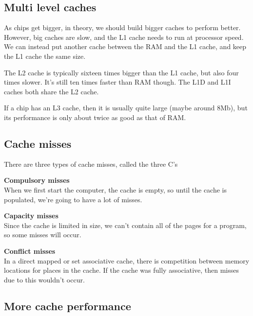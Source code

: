 \subsection{Multi level caches}

As chips get bigger, in theory, we should build bigger caches to perform better.
However, big caches are slow, and the L1 cache needs to run at processor speed.
We can instead put another cache between the RAM and the L1 cache, and keep the
L1 cache the same size.

The L2 cache is typically sixteen times bigger than the L1 cache, but also four
times slower. It's still ten times faster than RAM though. The L1D and L1I
caches both share the L2 cache.

If a chip has an L3 cache, then it is usually quite large (maybe around 8Mb),
but its performance is only about twice as good as that of RAM.


\subsection{Cache misses}

There are three types of cache misses, called the three C's

\begin{description}
  \item \textbf{Compulsory misses}\\ 
    When we first start the computer, the cache is empty, so until the cache is
    populated, we're going to have a lot of misses.
  \item \textbf{Capacity misses}\\
   Since the cache is limited in size, we can't contain all of the pages for a
   program, so some misses will occur.
  \item \textbf{Conflict misses}\\
    In a direct mapped or set associative cache, there is competition between
    memory locations for places in the cache. If the cache was fully
    associative, then misses due to this wouldn't occur.
\end{description}

\subsection{More cache performance}


